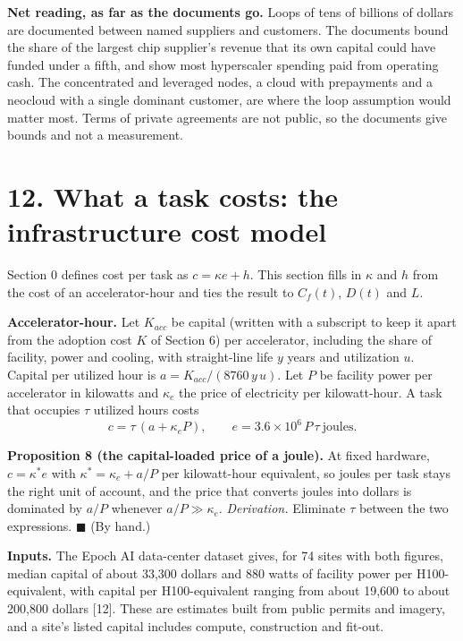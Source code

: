 \documentclass[10pt,letterpaper]{article}
\begin{document}
\textbf{Net reading, as far as the documents go.} Loops of tens of
billions of dollars are documented between named suppliers and
customers. The documents bound the share of the largest chip supplier's
revenue that its own capital could have funded under a fifth, and show
most hyperscaler spending paid from operating cash. The concentrated and
leveraged nodes, a cloud with prepayments and a neocloud with a single
dominant customer, are where the loop assumption would matter most.
Terms of private agreements are not public, so the documents give bounds
and not a measurement.

\section{12. What a task costs: the infrastructure cost
model}\label{what-a-task-costs-the-infrastructure-cost-model}

Section 0 defines cost per task as \(c = \kappa e + h\). This section
fills in \(\kappa\) and \(h\) from the cost of an accelerator-hour and
ties the result to \(C_f(t)\), \(D(t)\) and \(L\).

\textbf{Accelerator-hour.} Let \(K_{acc}\) be capital (written with a
subscript to keep it apart from the adoption cost \(K\) of Section 6)
per accelerator, including the share of facility, power and cooling,
with straight-line life \(y\) years and utilization \(u\). Capital per
utilized hour is \(a = K_{acc} / (8760\, y\, u)\). Let \(P\) be facility
power per accelerator in kilowatts and \(\kappa_e\) the price of
electricity per kilowatt-hour. A task that occupies \(\tau\) utilized
hours costs
\[c = \tau\,(a + \kappa_e P), \qquad e = 3.6\times 10^{6}\, P\,\tau \ \text{joules}.\]

\textbf{Proposition 8 (the capital-loaded price of a joule).} At fixed
hardware, \(c = \kappa^{*} e\) with \(\kappa^{*} = \kappa_e + a/P\) per
kilowatt-hour equivalent, so joules per task stays the right unit of
account, and the price that converts joules into dollars is dominated by
\(a/P\) whenever \(a/P \gg \kappa_e\). \emph{Derivation.} Eliminate
\(\tau\) between the two expressions. \(\blacksquare\) (By hand.)

\textbf{Inputs.} The Epoch AI data-center dataset gives, for 74 sites
with both figures, median capital of about 33,300 dollars and 880 watts
of facility power per H100-equivalent, with capital per H100-equivalent
ranging from about 19,600 to about 200,800 dollars {[}12{]}. These are
estimates built from public permits and imagery, and a site's listed
capital includes compute, construction and fit-out.
\end{document}
